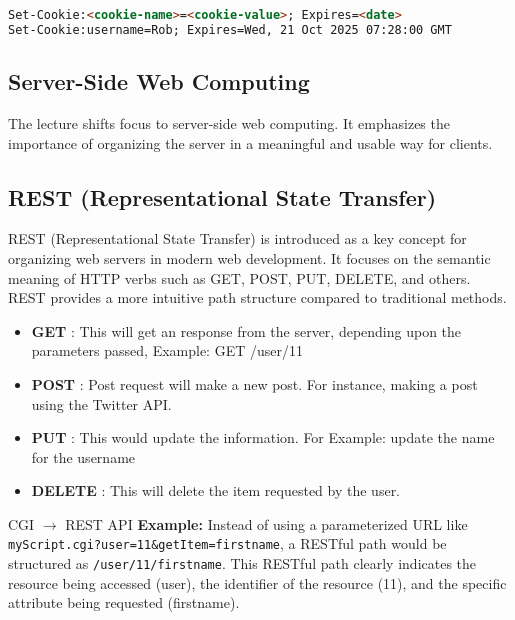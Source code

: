 \begin{lstlisting}[language=html,caption=Set cookie to expire]
Set-Cookie:<cookie-name>=<cookie-value>; Expires=<date> 
Set-Cookie:username=Rob; Expires=Wed, 21 Oct 2025 07:28:00 GMT 
\end{lstlisting}

\subsection{Server-Side Web Computing}

The lecture shifts focus to server-side web computing. It emphasizes the importance of organizing the server in a meaningful and usable way for clients.

\subsection{REST (Representational State Transfer)}

REST (Representational State Transfer) is introduced as a key concept for organizing web servers in modern web development. It focuses on the semantic meaning of HTTP verbs such as GET, POST, PUT, DELETE, and others. REST provides a more intuitive path structure compared to traditional methods.

\begin{itemize}[noitemsep, topsep=4pt]
	\item \textbf{GET} : This will get an response from the server, depending upon the parameters passed, Example: GET /user/11
	\item \textbf{POST} : Post request will make a new post. For instance, making a post using the Twitter API.
	\item \textbf{PUT} : This would update the information. For Example: update the name for the username
	\item \textbf{DELETE} : This will delete the item requested by the user.
\end{itemize}

\begin{example}{CGI $\rightarrow$ REST API}
\textbf{Example:} Instead of using a parameterized URL like \texttt{myScript.cgi?user=11\&getItem=firstname}, a RESTful path would be structured as \texttt{/user/11/firstname}. This RESTful path clearly indicates the resource being accessed (user), the identifier of the resource (11), and the specific attribute being requested (firstname).
\end{example}

